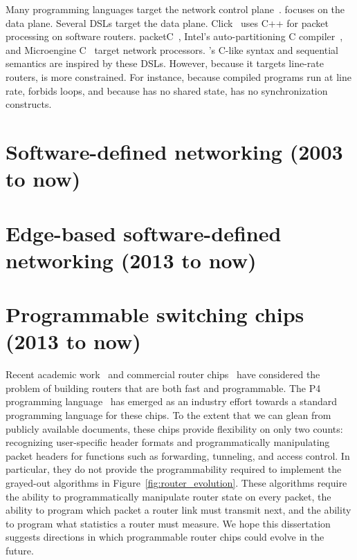 Many programming languages target
the network control plane~\cite{frenetic, maple}. \pktlanguage focuses on the
data plane. Several DSLs target the data plane. Click~\cite{click} uses C++ for
packet processing on software routers. packetC~\cite{packetc}, Intel's
auto-partitioning C compiler~\cite{intel_uiuc_pldi}, and Microengine
C~\cite{microenginec} target network processors. \pktlanguage's C-like syntax
and sequential semantics are inspired by these DSLs. However, because it
targets line-rate routers, \pktlanguage is more constrained. For instance,
because compiled programs run at line rate, \pktlanguage forbids loops, and
because \absmachine has no shared state, \pktlanguage has no synchronization
constructs.

\section{Software-defined networking (2003 to now)}

\section{Edge-based software-defined networking (2013 to now)}

\section{Programmable switching chips (2013 to now)}
Recent academic work~\cite{rmt} and commercial router chips~\cite{tofino,
flexpipe, xpliant} have considered the problem of building routers that are
both fast and programmable. The P4 programming language~\cite{p4} has emerged
as an industry effort towards a standard programming language for these chips.
To the extent that we can glean from publicly available documents, these chips
provide flexibility on only two counts: recognizing user-specific header
formats and programmatically manipulating packet headers for functions such as
forwarding, tunneling, and access control. In particular, they do not provide
the programmability required to implement the grayed-out algorithms in
Figure~\ref{fig:router_evolution}.  These algorithms require the ability to
programmatically manipulate router state on every packet, the ability to
program which packet a router link must transmit next, and the ability to
program what statistics a router must measure. We hope this
dissertation suggests directions in which programmable router
 chips could evolve in the future.

